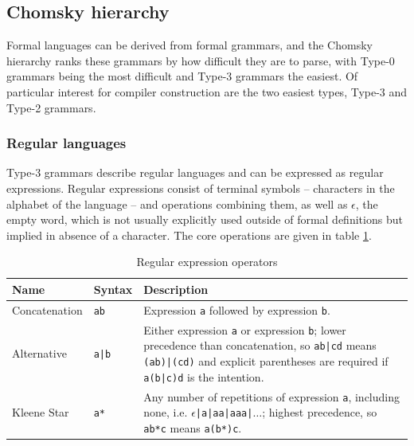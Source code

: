 		\subsection{Chomsky hierarchy}
			
			Formal languages can be derived from formal grammars, and the Chomsky hierarchy ranks these grammars by how difficult they are to parse, with Type-0 grammars being the most difficult and Type-3 grammars the easiest. Of particular interest for compiler construction are the two easiest types, Type-3 and Type-2 grammars.
			
			\subsubsection{Regular languages}
			
			Type-3 grammars describe regular languages and can be expressed as regular expressions. Regular expressions consist of terminal symbols -- characters in the alphabet of the language -- and operations combining them, as well as $\epsilon$, the empty word, which is not usually explicitly used outside of formal definitions but implied in absence of a character. The core operations are given in table \ref{tab:re_ops}.
			
			
			\begin{table}
			\begin{center}
			\begin{tabular}{ l l p{10cm} }
			\toprule
			Name         & Syntax & Description \\
			\midrule
			Concatenation & \lstinline$ab$  & Expression \lstinline$a$ followed by expression \lstinline$b$. \\
			Alternative   & \lstinline$a|b$ & Either expression \lstinline$a$ or expression \lstinline$b$; lower precedence than concatenation, so \lstinline$ab|cd$ means \lstinline$(ab)|(cd)$ and explicit parentheses are required if \lstinline$a(b|c)d$ is the intention. \\
			Kleene Star   & \lstinline$a*$  & Any number of repetitions of expression \lstinline$a$, including none, i.e. $\epsilon$\lstinline$|a|aa|aaa|$$\ldots$; highest precedence, so \lstinline$ab*c$ means \lstinline$a(b*)c$. \\
			\bottomrule
			\end{tabular}
			\caption{Regular expression operators}\label{tab:re_ops}
			\end{center}
			\end{table}
			
